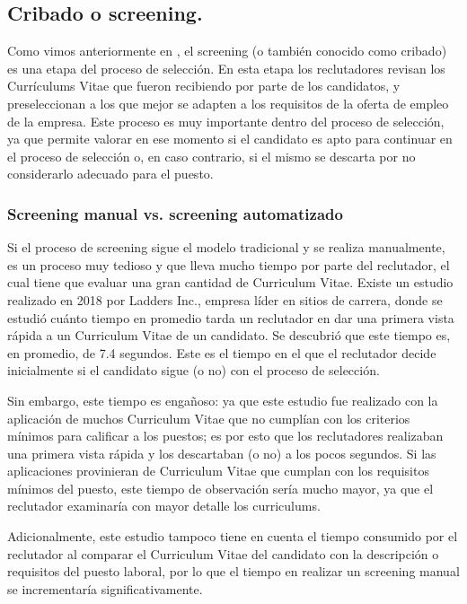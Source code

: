 \documentclass[12pt,a4paper]{article}
\begin{document}
\begin{sloppypar}
\cleardoublepage    %

\subsection{Cribado o screening.}  

Como vimos anteriormente en \textit{}, el screening (o también conocido como cribado) es una etapa del proceso de selección. En esta etapa los reclutadores revisan los Currículums Vitae que fueron recibiendo por parte de los candidatos, y preseleccionan a los que mejor se adapten a los requisitos de la oferta de empleo de la empresa. Este proceso es muy importante dentro del proceso de selección, ya que permite valorar en ese momento si el candidato es apto para continuar en el proceso de selección o, en caso contrario, si el mismo se descarta por no considerarlo adecuado para el puesto.

\subsubsection{Screening manual vs. screening automatizado}  

Si el proceso de screening sigue el modelo tradicional y se realiza manualmente, es un proceso muy tedioso y que lleva mucho tiempo por parte del reclutador, el cual tiene que evaluar una gran cantidad de Curriculum Vitae. Existe un estudio\cite{estudio_eye_tracking} realizado en 2018 por Ladders Inc., empresa líder en sitios de carrera, donde se estudió cuánto tiempo en promedio tarda un reclutador en dar una primera vista rápida a un Curriculum Vitae de un candidato. Se descubrió que este tiempo es, en promedio, de 7.4 segundos. Este es el tiempo en el que el reclutador decide inicialmente si el candidato sigue (o no) con el proceso de selección.

Sin embargo, este tiempo es engañoso: ya que este estudio fue realizado con la aplicación de muchos Curriculum Vitae que no cumplían con los criterios mínimos para calificar a los puestos; es por esto que los reclutadores realizaban una primera vista rápida y los descartaban (o no) a los pocos segundos. Si las aplicaciones provinieran de Curriculum Vitae que cumplan con los requisitos mínimos del puesto, este tiempo de observación sería mucho mayor, ya que el reclutador examinaría con mayor detalle los curriculums.

Adicionalmente, este estudio tampoco tiene en cuenta el tiempo consumido por el reclutador al comparar el Curriculum Vitae del candidato con la descripción o requisitos del puesto laboral, por lo que el tiempo en realizar un screening manual se incrementaría significativamente.


\end{sloppypar}
\end{document}
